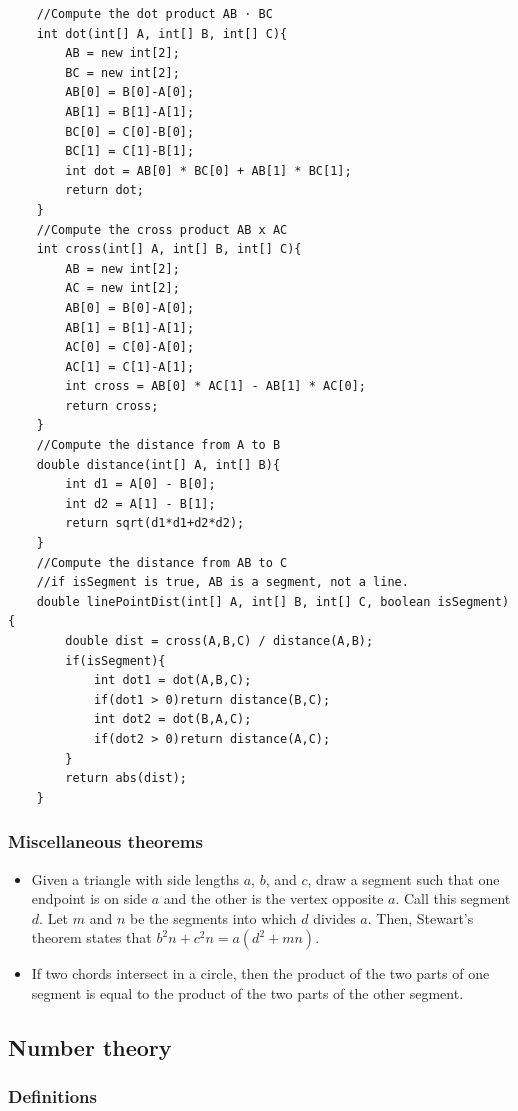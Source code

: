 \documentclass[a4paper,12pt]{article}
\begin{document}
\begin{lstlisting}
    //Compute the dot product AB ⋅ BC
    int dot(int[] A, int[] B, int[] C){
        AB = new int[2];
        BC = new int[2];
        AB[0] = B[0]-A[0];
        AB[1] = B[1]-A[1];
        BC[0] = C[0]-B[0];
        BC[1] = C[1]-B[1];
        int dot = AB[0] * BC[0] + AB[1] * BC[1];
        return dot;
    }
    //Compute the cross product AB x AC
    int cross(int[] A, int[] B, int[] C){
        AB = new int[2];
        AC = new int[2];
        AB[0] = B[0]-A[0];
        AB[1] = B[1]-A[1];
        AC[0] = C[0]-A[0];
        AC[1] = C[1]-A[1];
        int cross = AB[0] * AC[1] - AB[1] * AC[0];
        return cross;
    }
    //Compute the distance from A to B
    double distance(int[] A, int[] B){
        int d1 = A[0] - B[0];
        int d2 = A[1] - B[1];
        return sqrt(d1*d1+d2*d2);
    }
    //Compute the distance from AB to C
    //if isSegment is true, AB is a segment, not a line.
    double linePointDist(int[] A, int[] B, int[] C, boolean isSegment){
        double dist = cross(A,B,C) / distance(A,B);
        if(isSegment){
            int dot1 = dot(A,B,C);
            if(dot1 > 0)return distance(B,C);
            int dot2 = dot(B,A,C);
            if(dot2 > 0)return distance(A,C);
        }
        return abs(dist);
    }
\end{lstlisting}

\subsubsection{Miscellaneous theorems}
\begin{itemize}
\item Given a triangle with side lengths $a$, $b$, and $c$, draw a segment such that one endpoint is on side $a$ and the other is the vertex opposite $a$. Call this segment $d$. Let $m$ and $n$ be the segments into which $d$ divides $a$. Then, Stewart's theorem states that $b^2n+c^2n = a(d^2 + mn)$.
\item If two chords intersect in a circle, then the product of the two parts of one segment is equal to the product of the two parts of the other segment.
\end{itemize}

\subsection{Number theory}

\subsubsection{Definitions}
\end{document}

